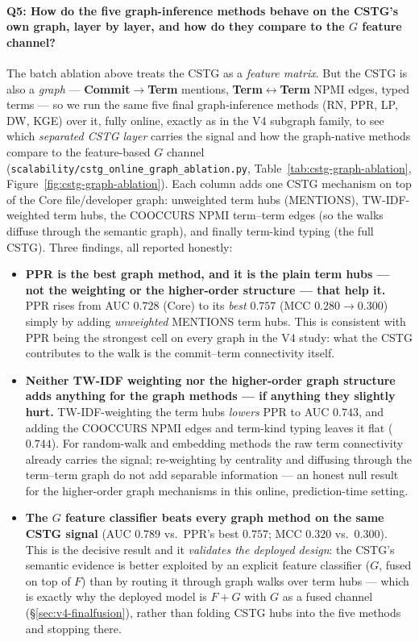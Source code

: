 \documentclass[11pt,a4paper]{article}
\newcommand{\code}[1]{\texttt{#1}}
\newcommand{\node}[1]{\textcolor{kgblue}{\textbf{#1}}}
\newcommand{\edge}[1]{\textsc{#1}}
\begin{document}
	\paragraph{Q5: How do the five graph-inference methods behave on the CSTG's own
	graph, layer by layer, and how do they compare to the $G$ feature channel?}
	The batch ablation above treats the CSTG as a \emph{feature matrix}. But the
	CSTG is also a \emph{graph} --- \node{Commit}$\rightarrow$\node{Term} mentions,
	\node{Term}$\leftrightarrow$\node{Term} NPMI edges, typed terms --- so we run the
	same five final graph-inference methods (RN, PPR, LP, DW, KGE) over it, fully
	online, exactly as in the V4 subgraph family, to see which \emph{separated CSTG
	layer} carries the signal and how the graph-native methods compare to the
	feature-based $G$ channel (\code{scalability/cstg\_online\_graph\_ablation.py},
	Table~\ref{tab:cstg-graph-ablation}, Figure~\ref{fig:cstg-graph-ablation}). Each
	column adds one CSTG mechanism on top of the Core file/developer graph: unweighted
	term hubs (\edge{MENTIONS}), TW-IDF-weighted term hubs, the \edge{COOCCURS} NPMI
	term--term edges (so the walks diffuse through the semantic graph), and finally
	term-kind typing (the full CSTG). Three findings, all reported honestly:
	\begin{itemize}[nosep,leftmargin=1.4em]
		\item \textbf{PPR is the best graph method, and it is the plain term hubs ---
		not the weighting or the higher-order structure --- that help it.} PPR rises
		from AUC $0.728$ (Core) to its \emph{best} $0.757$ (MCC $0.280\!\to\!0.300$)
		simply by adding \emph{unweighted} \edge{MENTIONS} term hubs. This is
		consistent with PPR being the strongest cell on every graph in the V4 study:
		what the CSTG contributes to the walk is the commit--term connectivity itself.
		\item \textbf{Neither TW-IDF weighting nor the higher-order graph structure
		adds anything for the graph methods --- if anything they slightly hurt.}
		TW-IDF-weighting the term hubs \emph{lowers} PPR to AUC $0.743$, and adding the
		\edge{COOCCURS} NPMI edges and term-kind typing leaves it flat ($0.744$).
		For random-walk and embedding methods the raw term connectivity already
		carries the signal; re-weighting by centrality and diffusing through the
		term--term graph do not add separable information --- an honest null result for
		the higher-order graph mechanisms in this online, prediction-time setting.
		\item \textbf{The $G$ feature classifier beats every graph method on the same
		CSTG signal} (AUC $0.789$ vs.\ PPR's best $0.757$; MCC $0.320$ vs.\ $0.300$).
		This is the decisive result and it \emph{validates the deployed design}: the
		CSTG's semantic evidence is better exploited by an explicit feature classifier
		($G$, fused on top of $F$) than by routing it through graph walks over term
		hubs --- which is exactly why the deployed model is $F{+}G$ with $G$ as a fused
		channel (\S\ref{sec:v4-finalfusion}), rather than folding CSTG hubs into the
		five methods and stopping there.
	\end{itemize}
\end{document}
